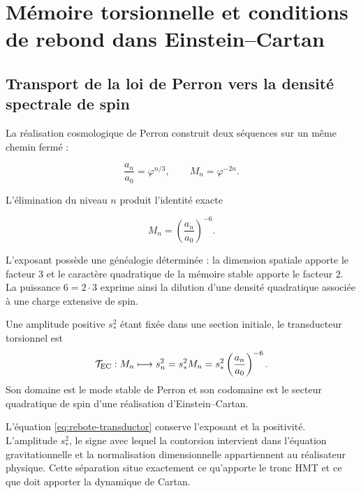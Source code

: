 \chapter{Mémoire torsionnelle et conditions de rebond dans Einstein--Cartan}
\label{ch:rebote-ec}

\section{Transport de la loi de Perron vers la densité spectrale de spin}

La réalisation cosmologique de Perron construit deux séquences sur un
même chemin fermé :

\begin{equation}
 \frac{a_n}{a_0}=\varphi^{n/3},
 \qquad
 M_n=\varphi^{-2n}.
 \label{eq:rebote-perron-pair}
\end{equation}

L'élimination du niveau \(n\) produit l'identité exacte

\begin{equation}
 \boxed{M_n=\left(\frac{a_n}{a_0}\right)^{-6}.}
 \label{eq:rebote-memory-six}
\end{equation}

L'exposant possède une généalogie déterminée : la dimension spatiale
apporte le facteur \(3\) et le caractère quadratique de la mémoire stable
apporte le facteur \(2\). La puissance \(6=2\cdot3\) exprime ainsi la dilution
d'une densité quadratique associée à une charge extensive de spin.

\begin{definition}
Une amplitude positive \(s_*^2\) étant fixée dans une section initiale, le transducteur
torsionnel est
\begin{equation}
 \mathcal T_{\rm EC}:M_n\longmapsto
 s_n^2=s_*^2M_n
 =s_*^2\left(\frac{a_n}{a_0}\right)^{-6}.
 \label{eq:rebote-transductor}
\end{equation}
Son domaine est le mode stable de Perron et son codomaine est le secteur
quadratique de spin d'une réalisation d'Einstein--Cartan.
\end{definition}

L'équation \cref{eq:rebote-transductor} conserve l'exposant et la
positivité. L'amplitude \(s_*^2\), le signe avec lequel la contorsion intervient dans
l'équation gravitationnelle et la normalisation dimensionnelle appartiennent au
réalisateur physique. Cette séparation situe exactement ce qu'apporte le
tronc HMT et ce que doit apporter la dynamique de Cartan.

